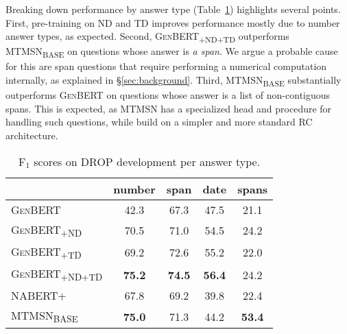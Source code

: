 \documentclass[11pt,a4paper]{article}
\newcommand\ssc[1]{\textsubscript{\textsc{#1}}}
\newcommand\genbert{\textsc{GenBERT}}
\newcommand\nabert{\textsc{NABERT+}}
\newcommand\mtmsn{\textsc{MTMSN}}
\begin{document}
Breaking down performance by answer type (Table~\ref{table:performance_per_answer_type}) highlights several points. First, pre-training on ND and TD improves performance mostly due to number answer types, as expected.
Second, \textsc{GenBERT\ssc{+ND+TD}} outperforms \mtmsn \textsubscript{\textsc{BASE}} on questions whose answer is \emph{a span}. We argue a probable cause for this are span questions that require performing a numerical computation internally, as explained in \S\ref{sec:background}.
Third, \mtmsn \textsubscript{\textsc{BASE}} substantially outperforms \genbert{} on questions whose answer is a list of non-contiguous spans. This is expected, as \mtmsn{} has a specialized head and procedure for handling such questions, while build on a simpler and more standard RC architecture.











\begin{table}[t]\setlength{\belowcaptionskip}{-10pt}
    \footnotesize
    \centering
    \begin{tabular}{l|c|c|c|c|}
         & number & span & date & spans \\ \hline
         \textsc{GenBERT} & 42.3 & 67.3 & 47.5 & 21.1 \\
\textsc{GenBERT\ssc{+ND}} & 70.5 & 71.0 & 54.5 & 24.2 \\
         \textsc{GenBERT\ssc{+TD}} & 69.2 & 72.6 & 55.2 & 22.0 \\
         \textsc{GenBERT\ssc{+ND+TD}} & \bf 75.2 & \bf 74.5 & \bf 56.4 & 24.2 \\
\hline\hline
         \nabert & 67.8 & 69.2 & 39.8 & 22.4 \\
         \mtmsn \textsubscript{\textsc{BASE}} & \bf 75.0 & 71.3 & 44.2 & \bf 53.4 \\
    \end{tabular}
    \caption{F$_1$ scores on DROP development per answer type.}
    \label{table:performance_per_answer_type}
\end{table}
\end{document}
